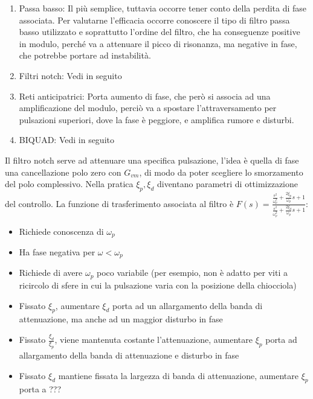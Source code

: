 \begin{enumerate}[label=\roman*.]
\begin{enumerate}[label=\alph*)]
            \item Passa basso: Il più semplice, tuttavia occorre tener conto della perdita di fase associata.
            Per valutarne l'efficacia occorre conoscere il tipo di filtro passa basso utilizzato e soprattutto l'ordine del filtro, che ha conseguenze positive in modulo, perché va a attenuare il picco di risonanza, ma negative in fase, che potrebbe portare ad instabilità.
            \item Filtri notch: Vedi in seguito
            \item Reti anticipatrici: Porta aumento di fase, che però si associa ad una amplificazione del modulo, perciò va a spostare l'attraversamento per pulsazioni superiori, dove la fase è peggiore, e amplifica rumore e disturbi.
            \item BIQUAD: Vedi in seguito
        \end{enumerate}
\end{enumerate}

Il filtro notch serve ad attenuare una specifica pulsazione, l'idea è quella di fase una cancellazione polo zero con \(G_{vm}\), di modo da poter scegliere lo smorzamento del polo complessivo. Nella pratica \(\xi_p,\xi_d\) diventano parametri di ottimizzazione del controllo.
La funzione di trasferimento associata al filtro è \(F(s) = \frac{\frac{s^2}{\omega_p^2} + \frac{2\xi_p}{\omega_p}s + 1}{\frac{s^2}{\omega_p^2} + \frac{2\xi_d}{\omega_p}s + 1}\):
\begin{itemize}
    \item Richiede conoscenza di \(\omega_p\)
    \item Ha fase negativa per \(\omega < \omega_p\)
    \item Richiede di avere \(\omega_p\) poco variabile (per esempio, non è adatto per viti a ricircolo di sfere in cui la pulsazione varia con la posizione della chiocciola)
    \item Fissato \(\xi_p\), aumentare \(\xi_d\) porta ad un allargamento della banda di attenuazione, ma anche ad un maggior disturbo in fase
    \item Fissato \(\frac{\xi_d}{\xi_p}\), viene mantenuta costante l'attenuazione, aumentare \(\xi_p\) porta ad allargamento della banda di attenuazione e disturbo in fase
    \item Fissato \(\xi_d\) mantiene fissata la largezza di banda di attenuazione, aumentare \(\xi_p\) porta a ???
\end{itemize}

